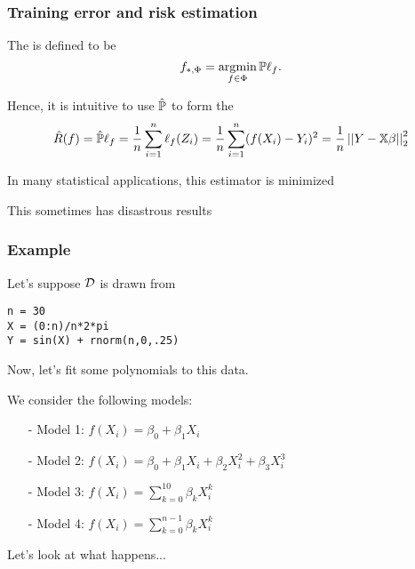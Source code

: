 \documentclass{beamer}
\begin{document}
\begin{frame}
\frametitle{Training error and risk estimation}
The  is defined to be
\[
f_{*,\Phi} = \argmin_{f \in \Phi} \P\ell_f.
\]

\vsp
Hence, it is intuitive to use $\hat{\P}$ to form the 
\[
\hat{R}(f) = \hat{\P}\ell_f = \frac{1}{n}\sum_{i=1}^n \ell_f(Z_i) = \frac{1}{n}\sum_{i=1}^n (f(X_i) - Y_i)^2
=
\frac{1}{n} \norm{Y - \X\beta}_2^2
\]
\vsp

In many statistical applications, this  estimator is minimized 


\vsp
This sometimes has disastrous results
\end{frame}


\begin{frame}[fragile]
\frametitle{Example}
Let's suppose $\data$ is drawn from

\begin{verbatim}
n = 30
X = (0:n)/n*2*pi
Y = sin(X) + rnorm(n,0,.25)
\end{verbatim}


Now, let's fit some polynomials to this data.  

\vsp
We consider the following models:
\begin{itemize}
\item[-] Model 1:  $f(X_i) = \beta_0 + \beta_1 X_{i}$
\item[-]Model 2: $f(X_i) = \beta_0 + \beta_1 X_{i} + \beta_2 X_{i}^2 + \beta_3 X_{i}^3$
\item[-]Model 3: $f(X_i) = \sum_{k=0}^{10} \beta_k X_{i}^k$
\item[-]Model 4: $f(X_i) = \sum_{k=0}^{n-1} \beta_k X_{i}^k$
\end{itemize}
Let's look at what happens...
\end{frame}
\end{document}
